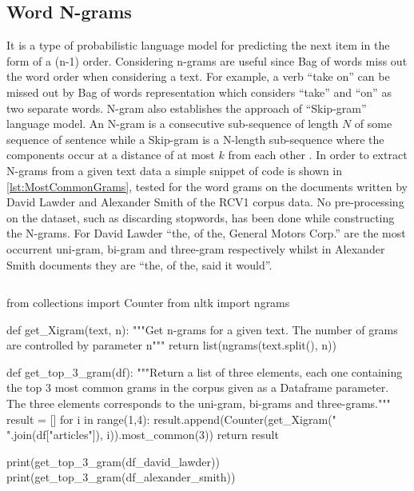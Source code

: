 \subsection{Word N-grams}
It is a type of probabilistic language model for predicting the next item in the form of a (n-1) order. Considering n-grams are useful since Bag of words miss out the word order when considering a text. For example, a verb “take on” can be missed out by Bag of words representation which considers “take” and “on” as two separate words. N-gram also establishes the approach of “Skip-gram” language model. An N-gram is a consecutive sub-sequence of length $N$ of some sequence of sentence while a Skip-gram is a N-length sub-sequence where the components occur at a distance of at most $k$ from each other \cite{mikolov2013efficient}.
In order to extract N-grams from a given text data a simple snippet of code is shown in \autoref{lst:MostCommonGrams}, tested for the word grams on the documents written by David Lawder and Alexander Smith of the RCV1 corpus data. No pre-processing on the dataset, such as discarding stopwords, has been done while constructing the N-grams. For David Lawder “the, of the, General Motors Corp.” are the most occurrent uni-gram, bi-gram and 
three-gram respectively whilst in Alexander Smith documents they are “the, of the, said it would”.

\begin{lstlisting}[frame=none,caption={Get the top 3 most common grams in the corpus, for uni-grams, bi-grams and three-grams.},captionpos=b,label=lst:MostCommonGrams]
\end{lstlisting}
\begin{python}	
	from collections import Counter
	from nltk import ngrams
	
	def get_Xigram(text, n):
		"""Get n-grams for a given text. The number of grams are controlled by parameter n"""
		return list(ngrams(text.split(), n))
	
	def get_top_3_gram(df):
		"""Return a list of three elements, each one containing the top 3 most common grams in the corpus given as a Dataframe parameter. The three elements corresponds to the uni-gram, bi-grams and three-grams."""
		result = []
		for i in range(1,4):
			result.append(Counter(get_Xigram(" ".join(df["articles"]), i)).most_common(3))
		return result
	
	print(get_top_3_gram(df_david_lawder))
	print(get_top_3_gram(df_alexander_smith))	
\end{python}


